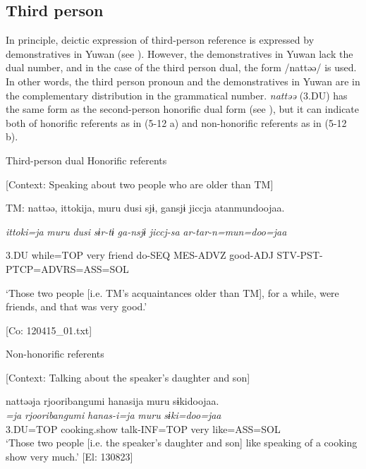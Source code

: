 \subsection{Third person}

In principle, deictic expression of third-person reference is expressed by demonstratives in Yuwan (see ). However, the demonstratives in Yuwan lack the dual number, and in the case of the third person dual, the form /nattəə/ is used. In other words, the third person pronoun and the demonstratives in Yuwan are in the complementary distribution in the grammatical number. \textit{nattəə} (3.DU) has the same form as the second-person honorific dual form (see ), but it can indicate both of honorific referents as in (5-12 a) and non-honorific referents as in (5-12 b).

\ea \label{ex:5:12}   Third-person dual
  \ea Honorific referents

  [Context: Speaking about two people who are older than TM]

  TM:  nattəə,  {\textbar}ittoki{\textbar}ja,  muru  dusi  sjɨ,  gansjɨ  jiccja atanmundoojaa.
                                                                                                                            
    \textit{}  \textit{ittoki=ja}  \textit{muru}  \textit{dusi}  \textit{sɨr-tɨ}  \textit{ga-nsjɨ}  \textit{jiccj-sa} \textit{ar-tar-n=mun=doo=jaa}
                                                                                                                            
    3.DU  while=TOP  very  friend  do-SEQ  MES-ADVZ  good-ADJ  STV-PST-PTCP=ADVRS=ASS=SOL
    
    ‘Those two people [i.e. TM’s acquaintances older than TM], for a while, were friends, and that was very good.’

    [Co: 120415\_01.txt]

  \ex Non-honorific referents

  [Context: Talking about the speaker’s daughter and son]

\glll  nattəəja  {\textbar}rjooribangumi{\textbar}  hanasija  muru  sɨkidoojaa.\\
\textit{=ja}  \textit{rjooribangumi}  \textit{hanas-i=ja}  \textit{muru}  \textit{sɨki=doo=jaa}\\
3.DU=TOP  cooking.show  talk-INF=TOP  very  like=ASS=SOL\\
\glt ‘Those two people [i.e. the speaker’s daughter and son] like speaking of a cooking show very much.’ [El: 130823]
\z
\z

